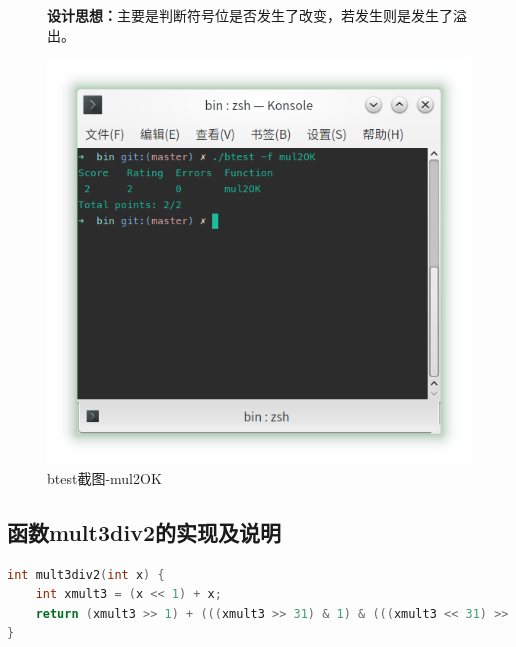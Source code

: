 \begin{figure}[H]
\begin{minipage}[c]{0.5\linewidth}
\textbf{设计思想：}主要是判断符号位是否发生了改变，若发生则是发生了溢出。
\end{minipage}
\begin{minipage}[c]{0.4\linewidth}
\centering
\includegraphics[width=0.9\linewidth]{figures/mul2OK}
\caption{btest截图-mul2OK}
\label{fig:mul2OK}
\end{minipage}
\end{figure}

\subsection{函数mult3div2的实现及说明}
\begin{lstlisting}[language = c]
int mult3div2(int x) {
    int xmult3 = (x << 1) + x;
    return (xmult3 >> 1) + (((xmult3 >> 31) & 1) & (((xmult3 << 31) >> 31) & 1));
}
\end{lstlisting}

